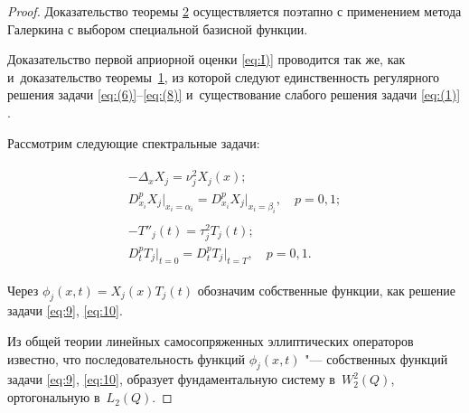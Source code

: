 \begin{proof} Доказательство теоремы \hyperlink{dzh:th2}{2} осуществляется поэтапно с применением метода Галеркина с выбором специальной базисной функции.

Доказательство первой априорной оценки \eqref{eq:I)} проводится так же, как и~доказательство теоремы~\hyperlink{dzh:th1}{1}, из которой следуют единственность регулярного решения задачи \eqref{eq:(6)}--\eqref{eq:(8)} и~существование слабого решения задачи \eqref{eq:(1)} \cite{dzhamalov:10}.




Рассмотрим следующие спектральные задачи:

\begin{gather}

\label{eq:9}

\begin{array}{c}

-{{\Delta }_{x}}{{X}_{j}}=\nu _{j}^{2}{{X}_{j}}(x);  \\

D_{x_i}^p X_j \bigr|_{x_i=\alpha_i}=

D_{x_i}^p X_j \bigr|_{x_i=\beta_i}, \quad p=0, 1;

\end{array}

\\

\label{eq:10}

\begin{array}{c}

   -T''_{j} (t)=\tau _{j}^{2}{{T}_{j}}(t);  \\

D_t^p T_j \bigr|_{t=0}= 

D_t^p T_j \bigr|_{t=T}, \quad p=0, 1.

\end{array}

\end{gather}

Через ${{\phi }_{j}}(x,t)={{X}_{j}}(x){{T}_{j}}(t)$ обозначим собственные функции, как решение задачи \eqref{eq:9}, \eqref{eq:10}.  

Из общей теории линейных самосопряженных эллиптических операторов \cite{dzhamalov:1, dzhamalov:10}  известно, что последовательность функций $\phi _j(x,t) $ "--- собственных функций задачи \eqref{eq:9}, \eqref{eq:10}, образует фундаментальную систему  в~$W_{2}^{2}(Q)$, ортогональную  в~${{L}_{2}}(Q)$.


\end{proof}
